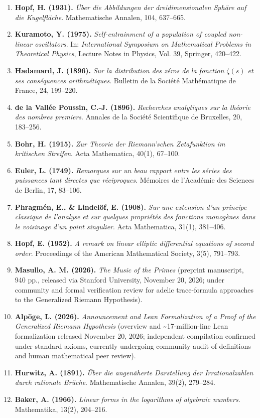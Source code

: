 \documentclass[
  11pt,
]{article}
\begin{document}
\begin{enumerate}
\item
  \textbf{Hopf, H. (1931).} \emph{Über die Abbildungen der
  dreidimensionalen Sphäre auf die Kugelfläche}. Mathematische Annalen,
  104, 637--665.
\item
  \textbf{Kuramoto, Y. (1975).} \emph{Self-entrainment of a population
  of coupled non-linear oscillators}. In: \emph{International Symposium
  on Mathematical Problems in Theoretical Physics}, Lecture Notes in
  Physics, Vol. 39, Springer, 420--422.
\item
  \textbf{Hadamard, J. (1896).} \emph{Sur la distribution des zéros de
  la fonction \(\zeta(s)\) et ses conséquences arithmétiques}. Bulletin
  de la Société Mathématique de France, 24, 199--220.
\item
  \textbf{de la Vallée Poussin, C.-J. (1896).} \emph{Recherches
  analytiques sur la théorie des nombres premiers}. Annales de la
  Société Scientifique de Bruxelles, 20, 183--256.
\item
  \textbf{Bohr, H. (1915).} \emph{Zur Theorie der Riemann'schen
  Zetafunktion im kritischen Streifen}. Acta Mathematica, 40(1),
  67--100.
\item
  \textbf{Euler, L. (1749).} \emph{Remarques sur un beau rapport entre
  les séries des puissances tant directes que réciproques}. Mémoires de
  l'Académie des Sciences de Berlin, 17, 83--106.
\item
  \textbf{Phragmén, E., \& Lindelöf, E. (1908).} \emph{Sur une extension
  d'un principe classique de l'analyse et sur quelques propriétés des
  fonctions monogènes dans le voisinage d'un point singulier}. Acta
  Mathematica, 31(1), 381--406.
\item
  \textbf{Hopf, E. (1952).} \emph{A remark on linear elliptic
  differential equations of second order}. Proceedings of the American
  Mathematical Society, 3(5), 791--793.
\item
  \textbf{Masullo, A. M. (2026).} \emph{The Music of the Primes}
  (preprint manuscript, 940 pp., released via Stanford University,
  November 20, 2026; under community and formal verification review for
  adelic trace-formula approaches to the Generalized Riemann
  Hypothesis).
\item
  \textbf{Alpöge, L. (2026).} \emph{Announcement and Lean Formalization
  of a Proof of the Generalized Riemann Hypothesis} (overview and
  \textasciitilde17-million-line Lean formalization released November
  20, 2026; independent compilation confirmed under standard axioms,
  currently undergoing community audit of definitions and human
  mathematical peer review).
\item
  \textbf{Hurwitz, A. (1891).} \emph{Über die angenäherte Darstellung
  der Irrationalzahlen durch rationale Brüche}. Mathematische Annalen,
  39(2), 279--284.
\item
  \textbf{Baker, A. (1966).} \emph{Linear forms in the logarithms of
  algebraic numbers}. Mathematika, 13(2), 204--216.
\end{enumerate}
\end{document}
